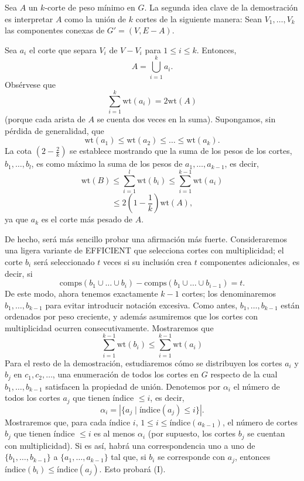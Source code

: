 \documentclass[a4paper, 12pt]{article}
\begin{document}
Sea \( A \) un \( k \)-corte de peso mínimo en \( G \). La segunda idea clave de la demostración es interpretar \( A \) como la unión de \( k \) cortes de la siguiente manera: Sean \( V_1, \dots, V_k \) las componentes conexas de \( G' = (V, E - A) \).  

Sea \( a_i \) el corte que separa \( V_i \) de \( V - V_i \) para \( 1 \leq i \leq k \). Entonces,
\[
A = \bigcup_{i=1}^{k} a_i.
\]
Obsérvese que  
\[
\sum_{i=1}^{k} \text{wt}(a_i) = 2\text{wt}(A)
\]
(porque cada arista de \( A \) se cuenta dos veces en la suma). Supongamos, sin pérdida de generalidad, que
\[
\text{wt}(a_1) \leq \text{wt}(a_2) \leq \dots \leq \text{wt}(a_k).
\]
La cota \( (2 - \frac{2}{k}) \) se establece mostrando que la suma de los pesos de los cortes, \( b_1, \dots, b_l \), es como máximo la suma de los pesos de \( a_1, \dots, a_{k-1} \), es decir,
\[
\text{wt}(B) \leq \sum_{i=1}^{l} \text{wt}(b_i) \leq \sum_{i=1}^{k-1} \text{wt}(a_i)
\]
\[
\leq 2(1 - \frac{1}{k})\text{wt}(A),
\]
ya que \( a_k \) es el corte más pesado de \( A \).

De hecho, será más sencillo probar una afirmación más fuerte. Consideraremos una ligera variante de \textsc{EFFICIENT} que selecciona cortes con multiplicidad; el corte \( b_i \) será seleccionado \( t \) veces si su inclusión crea \( t \) componentes adicionales, es decir, si
\[
\text{comps}(b_1 \cup \dots \cup b_i) - \text{comps}(b_1 \cup \dots \cup b_{i-1}) = t.
\]
De este modo, ahora tenemos exactamente \( k - 1 \) cortes; los denominaremos \( b_1, \dots, b_{k-1} \) para evitar introducir notación excesiva. Como antes, \( b_1, \dots, b_{k-1} \) están ordenados por peso creciente, y además asumiremos que los cortes con multiplicidad ocurren consecutivamente. Mostraremos que
\[
\sum_{i=1}^{k-1} \text{wt}(b_i) \leq \sum_{i=1}^{k-1} \text{wt}(a_i) \tag{I}
\]
Para el resto de la demostración, estudiaremos cómo se distribuyen los cortes \( a_i \) y \( b_j \) en \( c_1, c_2, \dots \), una enumeración de todos los cortes en \( G \) respecto de la cual \( b_1, \dots, b_{k-1} \) satisfacen la propiedad de unión. Denotemos por \( \alpha_i \) el número de todos los cortes \( a_j \) que tienen índice \( \leq i \), es decir,
\[
\alpha_i = \left| \{ a_j \mid \text{índice}(a_j) \leq i \} \right|.
\]
Mostraremos que, para cada índice \( i \), \( 1 \leq i \leq \text{índice}(a_{k-1}) \), el número de cortes \( b_j \) que tienen índice \( \leq i \) es al menos \( \alpha_i \) (por supuesto, los cortes \( b_j \) se cuentan con multiplicidad). Si es así, habrá una correspondencia uno a uno de \( \{b_1, \dots, b_{k-1}\} \) a \( \{a_1, \dots, a_{k-1}\} \) tal que, si \( b_i \) se corresponde con \( a_j \), entonces \( \text{índice}(b_i) \leq \text{índice}(a_j) \). Esto probará (I).
\end{document}
